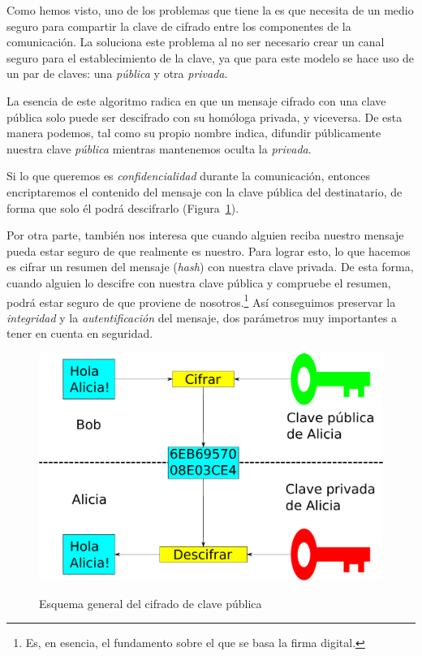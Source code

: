  Como hemos visto, uno de los problemas que tiene la  es que necesita de un medio seguro para compartir la clave de cifrado entre los componentes de la comunicación.
 La  soluciona este problema al no ser necesario crear un canal seguro para el establecimiento de la clave, ya que para este modelo se hace uso de un par de claves: una \emph{pública} y otra \emph{privada}.

 La esencia de este algoritmo radica en que un mensaje cifrado con una clave pública solo puede ser descifrado con su homóloga privada, y viceversa.
 De esta manera podemos, tal como su propio nombre indica, difundir públicamente nuestra clave \emph{pública} mientras mantenemos oculta la \emph{privada}.

 Si lo que queremos es \emph{confidencialidad} durante la comunicación, entonces encriptaremos el contenido del mensaje con la clave pública del destinatario, de forma que solo él podrá descifrarlo (Figura~\ref{fig:PublicKeyEncryption}).

 Por otra parte, también nos interesa que cuando alguien reciba nuestro mensaje pueda estar seguro de que realmente es nuestro.
 Para lograr esto, lo que hacemos es cifrar un resumen del mensaje (\emph{hash}) con nuestra clave privada.
 De esta forma, cuando alguien lo descifre con nuestra clave pública y compruebe el resumen, podrá estar seguro de que proviene de nosotros.\footnote{Es, en esencia, el fundamento sobre el que se basa la firma digital.}
 Así conseguimos preservar la \emph{integridad} y la \emph{autentificación} del mensaje, dos parámetros muy importantes a tener en cuenta en seguridad. \emph{\parencite{Reference14}}

 \begin{figure}[ht]
   \centering
   \includegraphics[scale=0.5]{Figures/PublicKeyEncryption}
   \decoRule
   \caption[Cifrado de clave pública (Esquema)]{Esquema general del cifrado de clave pública} \emph{\parencite{Reference5}}
   \label{fig:PublicKeyEncryption}
 \end{figure}

